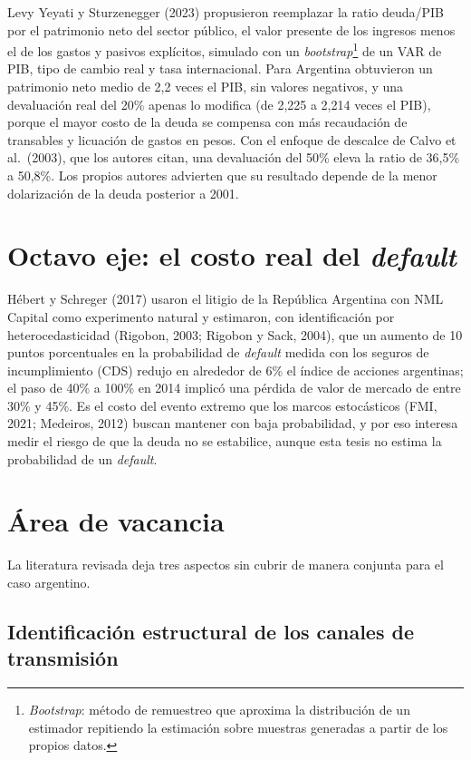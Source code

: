 Levy Yeyati y Sturzenegger (2023) propusieron reemplazar la ratio
deuda/PIB por el patrimonio neto del sector público, el valor presente
de los ingresos menos el de los gastos y pasivos explícitos, simulado
con un \emph{bootstrap}\footnote{\emph{Bootstrap}: método de remuestreo
  que aproxima la distribución de un estimador repitiendo la estimación
  sobre muestras generadas a partir de los propios datos.} de un VAR de
PIB, tipo de cambio real y tasa internacional. Para Argentina obtuvieron
un patrimonio neto medio de 2,2 veces el PIB, sin valores negativos, y
una devaluación real del 20\% apenas lo modifica (de 2,225 a 2,214 veces
el PIB), porque el mayor costo de la deuda se compensa con más
recaudación de transables y licuación de gastos en pesos. Con el enfoque
de descalce de Calvo et al.~(2003), que los autores citan, una
devaluación del 50\% eleva la ratio de 36,5\% a 50,8\%. Los propios
autores advierten que su resultado depende de la menor dolarización de
la deuda posterior a 2001.

\section{\texorpdfstring{Octavo eje: el costo real del
\emph{default}}{Octavo eje: el costo real del default}}

Hébert y Schreger (2017) usaron el litigio de la República Argentina con
NML Capital como experimento natural y estimaron, con identificación por
heterocedasticidad (Rigobon, 2003; Rigobon y Sack, 2004), que un aumento
de 10 puntos porcentuales en la probabilidad de \emph{default} medida
con los seguros de incumplimiento (CDS) redujo en alrededor de 6\% el
índice de acciones argentinas; el paso de 40\% a 100\% en 2014 implicó
una pérdida de valor de mercado de entre 30\% y 45\%. Es el costo del
evento extremo que los marcos estocásticos (FMI, 2021; Medeiros, 2012)
buscan mantener con baja probabilidad, y por eso interesa medir el
riesgo de que la deuda no se estabilice, aunque esta tesis no estima la
probabilidad de un \emph{default}.

\section{Área de vacancia}

La literatura revisada deja tres aspectos sin cubrir de manera conjunta
para el caso argentino.

\subsection{Identificación estructural de los canales de transmisión}

